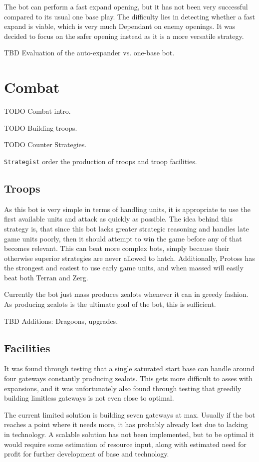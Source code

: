 		The bot can perform a fast expand opening, but it has not been very successful compared to its usual one base play. The difficulty lies in detecting whether a fast expand is viable, which is very much Dependant on enemy openings. It was decided to focus on the safer opening instead as it is a more versatile strategy.
		
		TBD Evaluation of the auto-expander vs. one-base bot.
		
\section{Combat}
TODO Combat intro.

TODO Building troops.

TODO Counter Strategies.

\texttt{Strategist} order the production of troops and troop facilities.

	\subsection*{Troops}
	As this bot is very simple in terms of handling units, it is appropriate to use the first available units and attack as quickly as possible. The idea behind this strategy is, that since this bot lacks greater strategic reasoning and handles late game units poorly, then it should attempt to win the game before any of that becomes relevant. This can beat more complex bots, simply because their otherwise superior strategies are never allowed to hatch. Additionally, Protoss has the strongest and easiest to use early game units, and when massed will easily beat both Terran and Zerg.

	Currently the bot just mass produces zealots whenever it can in greedy fashion. As producing zealots is the ultimate goal of the bot, this is sufficient.

	TBD Additions: Dragoons, upgrades.
	
	\subsection*{Facilities}
	It was found through testing that a single saturated start base can handle around four gateways constantly producing zealots. This gets more difficult to asses with expansions, and it was unfortunately also found through testing that greedily building limitless gateways is not even close to optimal.
	
	The current limited solution is building seven gateways at max. Usually if the bot reaches a point where it needs more, it has probably already lost due to lacking in technology. A scalable solution has not been implemented, but to be optimal it would require some estimation of resource input, along with estimated need for profit for further development of base and technology.

